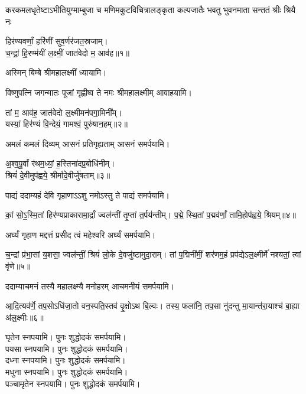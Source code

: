 

\begin{center}

{करकमलधृतेष्टाऽभीतियुग्माम्बुजा च}
{मणिमकुटविचित्रालङ्कृता कल्पजातैः}
{भवतु भुवनमाता सन्ततं श्रीः श्रियै नः}

हिर॑ण्यवर्णां॒ हरि॑णीं सुव॒र्णर॑जत॒स्रजाम्।\\
च॒न्द्रां॒ हि॒रण्म॑यीं ल॒क्ष्मीं॒ जात॑वेदो म॒ आव॑ह॥१॥

अस्मिन् बिम्बे श्रीमहालक्ष्मीं ध्यायामि।

{विष्णुपत्नि जगन्मातः पूजां गृह्णीष्व ते नमः}
श्रीमहालक्ष्मीम् आवाहयामि।

तां म॒ आव॑ह॒ जात॑वेदो ल॒क्ष्मीमन॑पगा॒मिनी᳚म्।\\
यस्यां॒ हिर॑ण्यं वि॒न्देयं॒ गामश्वं॒ पुरु॑षान॒हम्॥२॥


{अमलं कमलं दिव्यम् आसनं प्रतिगृह्यताम्}
 आसनं समर्पयामि।\medskip

अ॒श्व॒पू॒र्वां र॑थम॒ध्यां॒ ह॒स्तिना॑दप्र॒बोधि॑नीम्।\\
श्रियं॑ दे॒वीमुप॑ह्वये॒ श्रीर्मा॑दे॒वीर्जु॑षताम्॥३॥


{पाद्यं ददाम्यहं देवि गृहाणाऽऽशु नमोऽस्तु ते}
 पाद्यं समर्पयामि।\medskip

कां॒ सो॒ऽ॒स्मि॒तां हिर॑ण्यप्राकारामा॒र्द्रां ज्वल॑न्तीं तृ॒प्तां त॒र्पय॑न्तीम्।
प॒द्मे॒ स्थि॒तां प॒द्मव॑र्णां॒ तामि॒होप॑ह्वये॒ श्रियम्॥४॥

{अर्घ्यं गृहाण मद्दत्तं प्रसीद त्वं महेश्वरि}
 अर्घ्यं समर्पयामि।\medskip

च॒न्द्रां प्र॑भा॒सां य॒शसा॒ ज्वल॑न्तीं॒ श्रियं॑ लो॒के दे॒वजु॑ष्टामुदा॒राम्।
तां प॒द्मिनी॑मीं॒ शर॑णम॒हं प्रप॑द्येऽल॒क्ष्मीर्मे॑ नश्यतां॒ त्वां वृ॑णे॥५॥


{ददाम्याचमनं तस्यै महालक्ष्म्यै मनोहरम्}
 आचमनीयं समर्पयामि।\medskip

 आ॒दि॒त्यव॑र्णे॒ तप॒सोऽधि॑जा॒तो वन॒स्पति॒स्तव॑ वृ॒क्षोऽथ बि॒ल्वः।
तस्य॒ फला॑नि॒ तप॒सा नु॑दन्तु मा॒यान्त॑रा॒याश्च॑ बा॒ह्या अ॑ल॒क्ष्मीः॥६॥


घृतेन स्नपयामि। पुनः शुद्धोदकं समर्पयामि।\\
पयसा स्नपयामि। पुनः शुद्धोदकं समर्पयामि।\\
दध्ना स्नपयामि। पुनः शुद्धोदकं समर्पयामि।\\
मधुना स्नपयामि। पुनः शुद्धोदकं समर्पयामि।\\
पञ्चामृतेन स्नपयामि। पुनः शुद्धोदकं समर्पयामि।


\end{center}
